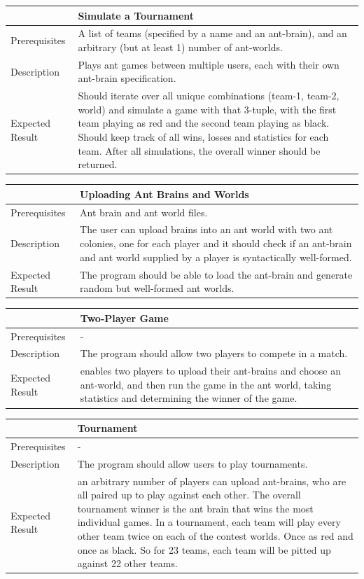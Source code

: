 \documentclass[11pt]{article}
\begin{document}
\begin{longtable}[c]{@{}p{}p{}@{}}
\toprule
& Simulate a Tournament \tabularnewline
\midrule
Prerequisites & A list of teams (specified by a name and an ant-brain),
and an arbitrary (but at least 1) number of ant-worlds. \tabularnewline
Description & Plays ant games between multiple users, each with their
own ant-brain specification. \tabularnewline
Expected Result & Should iterate over all unique combinations (team-1, team-2,
world) and simulate a game with that 3-tuple, with the first team
playing as red and the second team playing as black. Should keep track of all
wins, losses and statistics for each team. After all simulations, the
overall winner should be returned. \tabularnewline
\bottomrule
\end{longtable}

\begin{longtable}[c]{@{}p{}p{}@{}}
\toprule
& Uploading Ant Brains and Worlds \tabularnewline
\midrule
Prerequisites & Ant brain and ant world files. \tabularnewline
Description & The user can upload brains into an ant world with two
ant colonies, one for each player and it should check if an ant-brain
and ant world supplied by a player is syntactically well-formed. \tabularnewline
Expected Result & The program should be able to load the ant-brain and
generate random but well-formed ant worlds.\tabularnewline
\bottomrule
\end{longtable}

\begin{longtable}[c]{@{}p{}p{}@{}}
\toprule
& Two-Player Game \tabularnewline
\midrule
Prerequisites & - \tabularnewline
Description & The program should allow two players to compete in a match. \tabularnewline
Expected Result & enables two players to upload their ant-brains and
choose an ant-world, and then run the game in the ant world, taking
statistics and determining the winner of the game. \tabularnewline
\bottomrule
\end{longtable}

\begin{longtable}[c]{@{}p{}p{}@{}}
\toprule
& Tournament \tabularnewline
\midrule
Prerequisites & - \tabularnewline
Description & The program should allow users to play tournaments. \tabularnewline
Expected Result & an arbitrary number of players can upload ant-brains,
who are all paired up to play against each other. The overall tournament
winner is the ant brain that wins the most individual games. In a
tournament, each team will play every other team twice on each of the
contest worlds. Once as red and once as black. So for 23 teams, each
team will be pitted up against 22 other teams. \tabularnewline
\bottomrule
\end{longtable}
\end{document}
